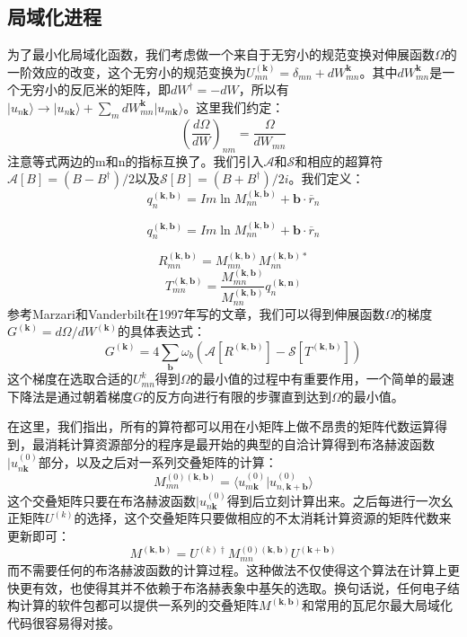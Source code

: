 \subsection{局域化进程}
为了最小化局域化函数，我们考虑做一个来自于无穷小的规范变换对伸展函数$\Omega$的一阶效应的改变，这个无穷小的规范变换为$U^(\bm{k})_{mn}=\delta_{mn}+dW_{mn}^{\bm{k}}$。其中$dW_{mn}^{\bm{k}}$是一个无穷小的反厄米的矩阵，即$dW^\dagger=-dW$，所以有$|u_{n\bm{k}}\rangle\rightarrow |u_{n\bm{k}}\rangle+\sum_mdW_{mn}^{\bm{k}}|u_{m\bm{k}}\rangle$。这里我们约定：
\begin{equation}
(\frac{d\Omega}{dW})_{nm}=\frac{\Omega}{dW_{mn}}
\end{equation}
注意等式两边的m和n的指标互换了。我们引入$\mathcal{A}$和$\mathcal{S}$和相应的超算符 $\mathcal{A}[B]=(B-B^\dagger)/2$以及$\mathcal{S}[B]=(B+B^\dagger)/2i$。我们定义：
\begin{equation}
q^(\bm{k},\bm{b})_n=Im \ln M^(\bm{k},\bm{b})_{nn}+\bm{b} \cdot \overline r_n
\end{equation}

\begin{equation}
q^(\bm{k},\bm{b})_n=Im \ln M^(\bm{k},\bm{b})_{nn}+\bm{b} \cdot \overline r_n
\end{equation}

\begin{equation}
R^{(\bm{k},\bm{b})}_{mn}= M^{(\bm{k},\bm{b})}_{mn}M^{(\bm{k},\bm{b})\ast}_{nn}
\end{equation}
\begin{equation}
T^{(\bm{k},\bm{b})}_{mn}= \frac{M^{(\bm{k},\bm{b})}_{mn}}{M^{(\bm{k},\bm{b})}_{nn}}q^{(\bm{k},\bm{n})}_n
\end{equation}
参考Marzari和Vanderbilt在1997年写的文章，我们可以得到伸展函数$\Omega$的梯度$G^{(\bm{k})}=d\Omega /dW^{(\bm{k})}$的具体表达式：
\begin{equation}
G^{(\bm{k})}=4\sum_{\bm{b}}\omega_b(\mathcal{A}[R^{(\bm{k},\bm{b})}]-\mathcal{S}[T^{(\bm{k},\bm{b})}])
\end{equation}
这个梯度在选取合适的$U_{mn}^{k}$得到$\Omega$的最小值的过程中有重要作用，一个简单的最速下降法是通过朝着梯度$G$的反方向进行有限的步骤直到达到$\Omega$的最小值。

在这里，我们指出，所有的算符都可以用在小矩阵上做不昂贵的矩阵代数运算得到，最消耗计算资源部分的程序是最开始的典型的自洽计算得到布洛赫波函数$|u^{(0)}_{n\bm{k}}$部分，以及之后对一系列交叠矩阵的计算：
\begin{equation}
M_{mn}^{(0)(\bm{k},\bm{b})}=\langle u_{m\bm{k}}^{(0)}|u^{(0)}_{n,\bm{k+b}}\rangle
\end{equation}
这个交叠矩阵只要在布洛赫波函数$|u^{(0)}_{n\bm{k}}$得到后立刻计算出来。之后每进行一次幺正矩阵$U^{(k)}$的选择，这个交叠矩阵只要做相应的不太消耗计算资源的矩阵代数来更新即可：
\begin{equation}
M^{(\bm{k},\bm{b})}=U^{(k)\dagger}M_{mn}^{(0)(\bm{k},\bm{b})}U^{\bm{(k+b)}}
\end{equation}
而不需要任何的布洛赫波函数的计算过程。这种做法不仅使得这个算法在计算上更快更有效，也使得其并不依赖于布洛赫表象中基矢的选取。换句话说，任何电子结构计算的软件包都可以提供一系列的交叠矩阵$M^{(\bm{k},\bm{b})}$和常用的瓦尼尔最大局域化代码很容易得对接。
